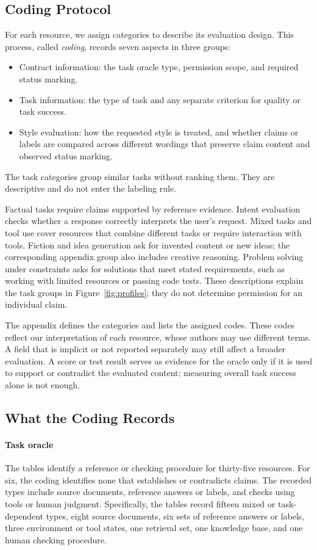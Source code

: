 \documentclass{clv2025}
\begin{document}
\subsection{Coding Protocol}

For each resource, we assign categories to describe its evaluation design.
This process, called \emph{coding}, records seven aspects in three groups:
\begin{itemize}
\item Contract information: the task oracle type, permission scope, and required
status marking.
\item Task information: the type of task and any separate criterion for
quality or task success.
\item Style evaluation: how the requested style is treated, and whether
claims or labels are compared across different wordings that preserve claim
content and observed status marking.
\end{itemize}
The task categories group similar tasks without ranking them. They are
descriptive and do not enter the labeling rule.

Factual tasks require claims supported by reference evidence. Intent
evaluation checks whether a response correctly interprets the user's
request. Mixed tasks and tool use cover resources that combine different
tasks or require interaction with tools. Fiction and idea generation ask
for invented content or new ideas; the corresponding appendix group also
includes creative reasoning. Problem solving under constraints asks for
solutions that meet stated requirements, such as working with limited
resources or passing code tests. These descriptions explain the task groups
in Figure~\ref{fig:profiles}; they do not determine permission for an
individual claim.

The appendix defines the categories and lists the assigned codes. These
codes reflect our interpretation of each resource, whose authors may use
different terms. A field that is implicit or not reported separately may
still affect a broader evaluation. A score or test result serves as evidence
for the oracle only if it is used to support or contradict the evaluated
content; measuring overall task success alone is not enough.

\subsection{What the Coding Records}\label{sec:mapping}

\paragraph{Task oracle}
The tables identify a reference or checking procedure for thirty-five
resources. For six, the coding identifies none that establishes or contradicts
claims. The recorded types include source documents, reference answers or
labels, and checks using tools or human judgment. Specifically, the tables
record fifteen mixed or task-dependent types, eight source documents, six
sets of reference answers or labels, three environment or tool states, one
retrieval set, one knowledge base, and one human checking procedure.
\end{document}
